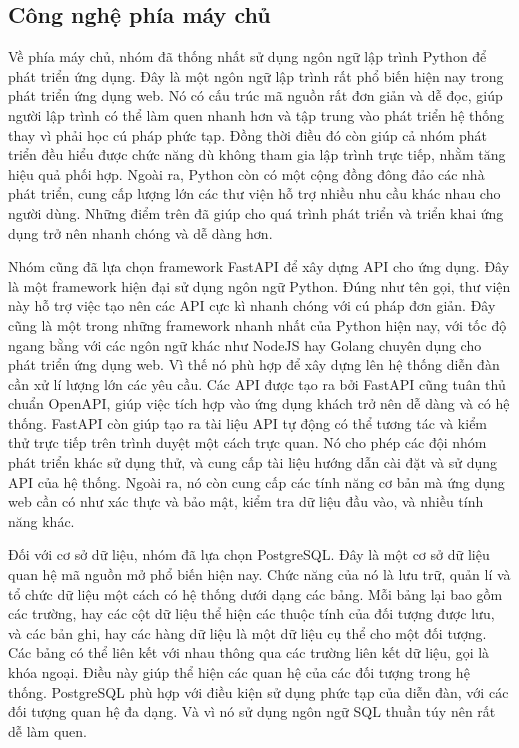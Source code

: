 \documentclass[../main.tex]{subfiles}
\begin{document}
\subsection {Công nghệ phía máy chủ}

Về phía máy chủ, nhóm đã thống nhất sử dụng ngôn ngữ lập trình Python để phát triển ứng dụng. Đây là một ngôn ngữ lập trình rất phổ biến hiện nay trong phát triển ứng dụng web.
Nó có cấu trúc mã nguồn rất đơn giản và dễ đọc, giúp người lập trình có thể làm quen nhanh hơn và tập trung vào phát triển hệ thống thay vì phải học cú pháp phức tạp. Đồng thời
điều đó còn giúp cả nhóm phát triển đều hiểu được chức năng dù không tham gia lập trình trực tiếp, nhằm tăng hiệu quả phối hợp. Ngoài ra, Python còn có một cộng đồng đông đảo các nhà phát triển,
cung cấp lượng lớn các thư viện hỗ trợ nhiều nhu cầu khác nhau cho người dùng. Những điểm trên đã giúp cho quá trình phát triển và triển khai ứng dụng trở nên nhanh chóng và dễ dàng hơn.

Nhóm cũng đã lựa chọn framework FastAPI để xây dựng API cho ứng dụng. Đây là một framework hiện đại sử dụng ngôn ngữ Python. Đúng như tên gọi, thư viện này hỗ trợ việc tạo nên các API cực kì nhanh chóng với
cú pháp đơn giản. Đây cũng là một trong những framework nhanh nhất của Python hiện nay, với tốc độ ngang bằng với các ngôn ngữ khác như NodeJS hay Golang chuyên dụng cho phát triển ứng dụng web. Vì thế nó phù hợp
để xây dựng lên hệ thống diễn đàn cần xử lí lượng lớn các yêu cầu. Các API được tạo ra bởi FastAPI cũng tuân thủ chuẩn OpenAPI, giúp việc tích hợp vào ứng dụng khách trở nên dễ dàng và có hệ thống.
FastAPI còn giúp tạo ra tài liệu API tự động có thể tương tác và kiểm thử trực tiếp trên trình duyệt một cách trực quan. Nó cho phép các đội nhóm phát triển khác sử dụng thử, và cung cấp tài liệu hướng dẫn cài đặt và sử dụng API của hệ thống.
Ngoài ra, nó còn cung cấp các tính năng cơ bản mà ứng dụng web cần có như xác thực và bảo mật, kiểm tra dữ liệu đầu vào, và nhiều tính năng khác.

Đối với cơ sở dữ liệu, nhóm đã lựa chọn PostgreSQL. Đây là một cơ sở dữ liệu quan hệ mã nguồn mở phổ biến hiện nay. Chức năng của nó là lưu trữ, quản lí và tổ chức dữ liệu một cách có hệ thống dưới dạng các bảng.
Mỗi bảng lại bao gồm các trường, hay các cột dữ liệu thể hiện các thuộc tính của đối tượng được lưu, và các bản ghi, hay các hàng dữ liệu là một dữ liệu cụ thể cho một đối tượng. Các bảng có thể liên kết với nhau thông qua các trường liên kết dữ liệu, gọi là khóa ngoại.
Điều này giúp thể hiện các quan hệ của các đối tượng trong hệ thống. PostgreSQL phù hợp với điều kiện sử dụng phức tạp của diễn đàn, với các đối tượng quan hệ đa dạng. Và vì nó sử dụng ngôn ngữ SQL thuần túy nên rất dễ làm quen.
\end{document}
